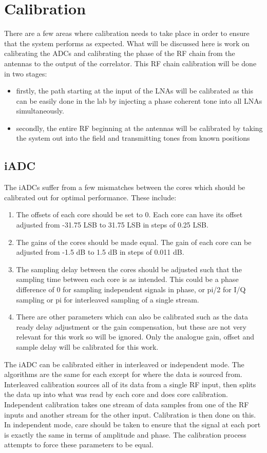\chapter{Calibration}

There are a few areas where calibration needs to take place in order to ensure that the system performs as expected. What will be discussed here is work on calibrating the ADCs and calibrating the phase of the RF chain from the antennas to the output of the correlator. This RF chain calibration will be done in two stages: 
\begin{itemize}
  \item firstly, the path starting at the input of the LNAs will be calibrated as this can be easily done in the lab by injecting a phase coherent tone into all LNAs simultaneously.
  \item secondly, the entire RF beginning at the antennas will be calibrated by taking the system out into the field and transmitting tones from known positions
\end{itemize}

\section{iADC}
The iADCs suffer from a few mismatches between the cores which should be calibrated out for optimal performance. These include:
\begin{enumerate}
  \item The offsets of each core should be set to 0. Each core can have its offset adjusted from -31.75 LSB to 31.75 LSB in steps of 0.25 LSB.
  \item The gains of the cores should be made equal. The gain of each core can be adjusted from -1.5 dB to 1.5 dB in steps of 0.011 dB. 
  \item The sampling delay between the cores should be adjusted such that the sampling time between each core is as intended. This could be a phase difference of 0 for sampling independent signals in phase, or pi/2 for I/Q sampling or pi for interleaved sampling of a single stream.
  \item There are other parameters which can also be calibrated such as the data ready delay adjustment or the gain compensation, but these are not very relevant for this work so will be ignored. Only the analogue gain, offset and sample delay will be calibrated for this work.
\end{enumerate}

The iADC can be calibrated either in interleaved or independent mode. The algorithms are the same for each except for where the data is sourced from. Interleaved calibration sources all of its data from a single RF input, then splits the data up into what was read by each core and does core calibration. Independent calibration takes one stream of data samples from one of the RF inputs and another stream for the other input. Calibration is then done on this. In independent mode, care should be taken to ensure that the signal at each port is exactly the same in terms of amplitude and phase. The calibration process attempts to force these parameters to be equal.

